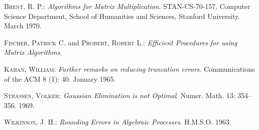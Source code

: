 \documentclass{amsart}
\begin{document}
\newpage\begin{thebibliography}{5}
 \textsc{Brent, R. P.}: \emph{Algorithms for Matrix Multiplication}. STAN-CS-70-157. Computer Science Department, School of Humanities and Sciences, Stanford University. March 1970.

 \textsc{Fischer, Patrick C.} and \textsc{Probert, Robert L.}: \emph{Efficient Procedures for using Matrix Algorithms}.

 \textsc{Kahan, William}: \emph{Further remarks on reducing truncation errors}. 
Communications of the ACM 8 (1): 40. January 1965.

 \textsc{Strassen, Volker}: \emph{Gaussian Elimination is not Optimal}. Numer. Math. 13: 354--356. 1969.

 \textsc{Wilkinson, J. H.}: \emph{Rounding Errors in Algebraic Processes}. H.M.S.O. 1963.
\end{thebibliography}
\end{document}
